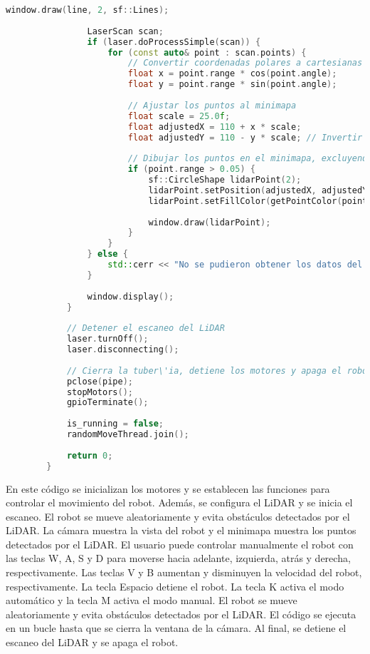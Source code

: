 \begin{lstlisting}[language={C++}, caption={Primera versi\'on del c\'odigo del sistema de control del robot}, label={Script}]
                window.draw(line, 2, sf::Lines);
        
                LaserScan scan;
                if (laser.doProcessSimple(scan)) {
                    for (const auto& point : scan.points) {
                        // Convertir coordenadas polares a cartesianas
                        float x = point.range * cos(point.angle);
                        float y = point.range * sin(point.angle);
        
                        // Ajustar los puntos al minimapa
                        float scale = 25.0f;
                        float adjustedX = 110 + x * scale;
                        float adjustedY = 110 - y * scale; // Invertir Y para coordinar con la pantalla
        
                        // Dibujar los puntos en el minimapa, excluyendo el centro (0,0)
                        if (point.range > 0.05) {
                            sf::CircleShape lidarPoint(2);
                            lidarPoint.setPosition(adjustedX, adjustedY);
                            lidarPoint.setFillColor(getPointColor(point.range, max_range));
        
                            window.draw(lidarPoint);
                        }
                    }
                } else {
                    std::cerr << "No se pudieron obtener los datos del LiDAR." << std::endl;
                }
        
                window.display();
            }
        
            // Detener el escaneo del LiDAR
            laser.turnOff();
            laser.disconnecting();
        
            // Cierra la tuber\'ia, detiene los motores y apaga el robot
            pclose(pipe);
            stopMotors();
            gpioTerminate();
        
            is_running = false;
            randomMoveThread.join();
        
            return 0;
        }
    \end{lstlisting}

    En este c\'odigo se inicializan los motores y se establecen las funciones para controlar el movimiento del robot. 
        Adem\'as, se configura el LiDAR y se inicia el escaneo. El robot se mueve aleatoriamente y evita obst\'aculos 
        detectados por el LiDAR. La c\'amara muestra la vista del robot y el minimapa muestra los puntos detectados por 
        el LiDAR. El usuario puede controlar manualmente el robot con las teclas W, A, S y D para moverse hacia adelante, 
        izquierda, atr\'as y derecha, respectivamente. Las teclas V y B aumentan y disminuyen la velocidad del robot, 
        respectivamente. La tecla Espacio detiene el robot. La tecla K activa el modo autom\'atico y la tecla M activa 
        el modo manual. El robot se mueve aleatoriamente y evita obst\'aculos detectados por el LiDAR. El c\'odigo se ejecuta 
        en un bucle hasta que se cierra la ventana de la c\'amara. Al final, se detiene el escaneo del LiDAR y se apaga el robot.
    
